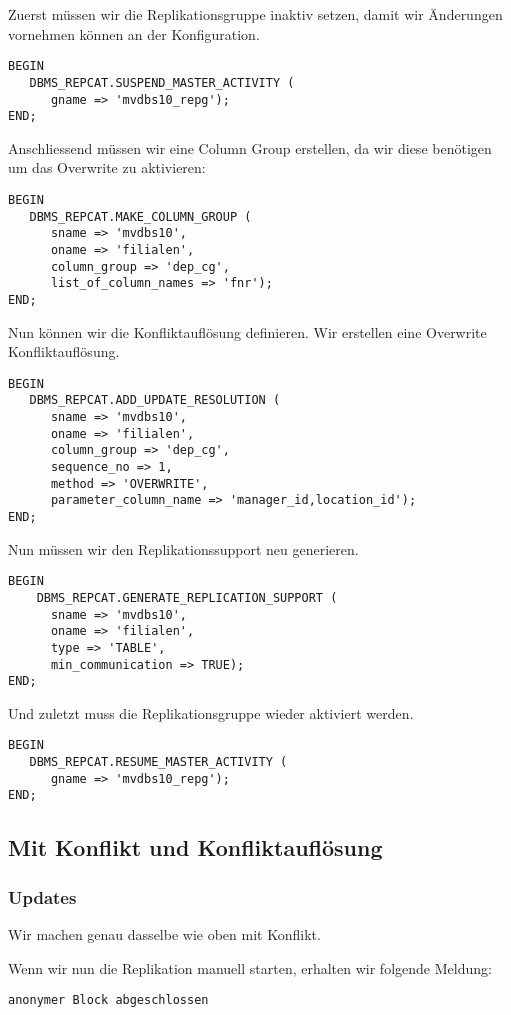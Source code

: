 \documentclass[11pt,a4paper,parskip=half]{scrartcl}
\begin{document}
Zuerst müssen wir die Replikationsgruppe inaktiv setzen, damit wir Änderungen vornehmen können an der Konfiguration.
\begin{lstlisting}
BEGIN
   DBMS_REPCAT.SUSPEND_MASTER_ACTIVITY (
      gname => 'mvdbs10_repg');
END;
\end{lstlisting}

Anschliessend müssen wir eine Column Group erstellen, da wir diese benötigen um das Overwrite zu aktivieren:
\begin{lstlisting}
BEGIN
   DBMS_REPCAT.MAKE_COLUMN_GROUP (
      sname => 'mvdbs10',
      oname => 'filialen',
      column_group => 'dep_cg',
      list_of_column_names => 'fnr');
END;
\end{lstlisting}

Nun können wir die Konfliktauflösung definieren. Wir erstellen eine Overwrite Konfliktauflösung.
\begin{lstlisting}
BEGIN
   DBMS_REPCAT.ADD_UPDATE_RESOLUTION (
      sname => 'mvdbs10',
      oname => 'filialen',
      column_group => 'dep_cg',
      sequence_no => 1,
      method => 'OVERWRITE',
      parameter_column_name => 'manager_id,location_id');
END;
\end{lstlisting}

Nun müssen wir den Replikationssupport neu generieren.
\begin{lstlisting}
BEGIN 
    DBMS_REPCAT.GENERATE_REPLICATION_SUPPORT (
      sname => 'mvdbs10',
      oname => 'filialen', 
      type => 'TABLE',
      min_communication => TRUE); 
END;
\end{lstlisting}

Und zuletzt muss die Replikationsgruppe wieder aktiviert werden.
\begin{lstlisting}
BEGIN
   DBMS_REPCAT.RESUME_MASTER_ACTIVITY (
      gname => 'mvdbs10_repg');
END;
\end{lstlisting}

\subsection{Mit Konflikt und Konfliktauflösung}
\subsubsection{Updates}
Wir machen genau dasselbe wie oben mit Konflikt.

Wenn wir nun die Replikation manuell starten, erhalten wir folgende Meldung:
\begin{lstlisting}
anonymer Block abgeschlossen
\end{lstlisting}
\end{document}
